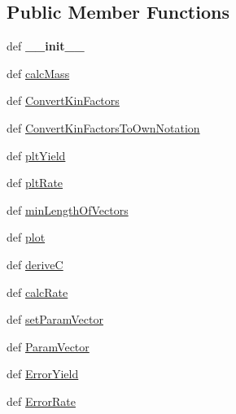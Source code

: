 \subsection*{\-Public \-Member \-Functions}
\begin{DoxyCompactItemize}
\item 
\hypertarget{classFit__one__run_1_1ArrheniusModelAlternativeNotation1_a3838b3d98fc08fbf46ee4d52e76a2c1e}{def {\bfseries \-\_\-\-\_\-init\-\_\-\-\_\-}}\label{classFit__one__run_1_1ArrheniusModelAlternativeNotation1_a3838b3d98fc08fbf46ee4d52e76a2c1e}

\item 
def \hyperlink{classFit__one__run_1_1ArrheniusModelAlternativeNotation1_ae5173ca0b3b89ddf7d5407a6023d693f}{calc\-Mass}
\item 
def \hyperlink{classFit__one__run_1_1ArrheniusModelAlternativeNotation1_a0bec2d240a20bdd5b5e4a08bf603c705}{\-Convert\-Kin\-Factors}
\item 
def \hyperlink{classFit__one__run_1_1ArrheniusModelAlternativeNotation1_aa93288bf70f57ce16ae065bf8146f899}{\-Convert\-Kin\-Factors\-To\-Own\-Notation}
\item 
def \hyperlink{classFit__one__run_1_1Model_aa304b32155938a713c33f0dc03a135f3}{plt\-Yield}
\item 
def \hyperlink{classFit__one__run_1_1Model_a9c28d95902adf00f5aaa642f0919fc61}{plt\-Rate}
\item 
def \hyperlink{classFit__one__run_1_1Model_a26fc879ca33c9171ebb4a97bc4b0c46b}{min\-Length\-Of\-Vectors}
\item 
def \hyperlink{classFit__one__run_1_1Model_a98159c954f1f1be2a34be3ea53d11493}{plot}
\item 
def \hyperlink{classFit__one__run_1_1Model_ace9df4177c5ae753dbe190e2f8268149}{derive\-C}
\item 
def \hyperlink{classFit__one__run_1_1Model_a07ae4534de2a6ef241d71facdffb227e}{calc\-Rate}
\item 
def \hyperlink{classFit__one__run_1_1Model_a174aec9b05dbe01ec103f7ba75d6516c}{set\-Param\-Vector}
\item 
def \hyperlink{classFit__one__run_1_1Model_a3c9239f0ac062fdae0bda395636c0372}{\-Param\-Vector}
\item 
def \hyperlink{classFit__one__run_1_1Model_aa2bc4ba19704350fb2ff441734b51b10}{\-Error\-Yield}
\item 
def \hyperlink{classFit__one__run_1_1Model_aad63c345c343f0c7d1cf20135dc0a0e5}{\-Error\-Rate}
\end{DoxyCompactItemize}
